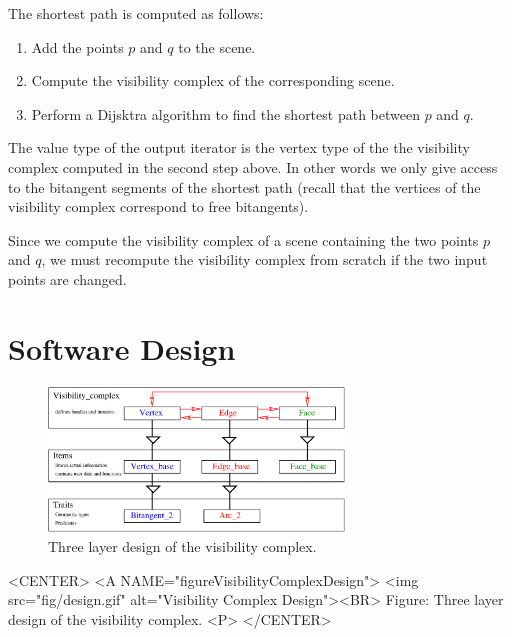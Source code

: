 The shortest path is computed as follows:
\begin{enumerate}
    \item Add the points $p$ and $q$ to the scene.
    \item Compute the visibility complex of the corresponding scene.
    \item Perform a Dijsktra algorithm to find the shortest path between $p$ and
    $q$.
\end{enumerate}
The value type of the output iterator is the vertex type of the the visibility
complex computed in the second step above. In other words we only give access to
the bitangent segments of the shortest path (recall that the vertices of the
visibility complex correspond to free bitangents). 

Since we compute the visibility complex of a scene containing the two points $p$
and $q$, we must recompute the visibility complex from scratch if the two input
points are changed.

\section{Software Design}
\begin{ccTexOnly}
  \begin{figure}
    \begin{center}
      \parbox{0.7\textwidth}{%
          \includegraphics[width=0.7\textwidth]{fig/design.eps}%
      }
    \end{center}
    \caption{Three layer design of the visibility complex.}
    \label{figureVisibilityComplexDesign}
  \end{figure}
\end{ccTexOnly}

\begin{ccHtmlOnly}
    <CENTER>
    <A NAME="figureVisibilityComplexDesign">
        <img src="fig/design.gif"
         alt="Visibility Complex Design"><BR>
    Figure: Three layer design of the visibility complex.
    <P>
    </CENTER>
\end{ccHtmlOnly}

